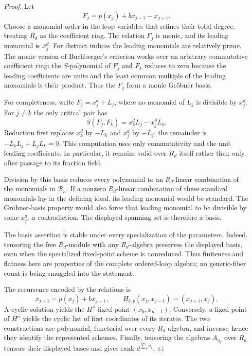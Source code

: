 \documentclass[11pt]{article}
\theoremstyle{definition}
\theoremstyle{remark}
\begin{document}
\begin{proof}
Let
\[
  F_j=p(x_j)+b x_{j-1}-x_{j+1}.
\]
Choose a monomial order in the loop variables that refines their total
degree, treating $R_d$ as the coefficient ring.  The relation $F_j$ is
monic, and its leading monomial is $x_j^d$.  For distinct indices the
leading monomials are relatively prime.  The monic version of Buchberger's
criterion works over an arbitrary commutative coefficient ring: the
$S$-polynomial of $F_j$ and $F_k$ reduces to zero because the leading
coefficients are units and the least common multiple of the leading
monomials is their product.  Thus the $F_j$ form a monic Gröbner basis.

For completeness, write $F_j=x_j^d+L_j$, where no monomial of $L_j$ is
divisible by $x_j^d$.  For $j\neq k$ the only critical pair has
\[
  S(F_j,F_k)=x_k^dL_j-x_j^dL_k.
\]
Reduction first replaces $x_k^d$ by $-L_k$ and $x_j^d$ by $-L_j$; the
remainder is $-L_kL_j+L_jL_k=0$.  This computation uses only commutativity
and the unit leading coefficients.  In particular, it remains valid over
$R_d$ itself rather than only after passage to its fraction field.

Division by this basis reduces every polynomial to an $R_d$-linear
combination of the monomials in $\mathcal B_n$.  If a nonzero
$R_d$-linear combination of these standard monomials lay in the defining
ideal, its leading monomial would be standard.  The Gröbner-basis property
would also force that leading monomial to be divisible by some $x_j^d$, a
contradiction.  The displayed spanning set is therefore a basis.

The basis assertion is stable under every specialization of the
parameters.  Indeed, tensoring the free $R_d$-module with any
$R_d$-algebra preserves the displayed basis, even when the specialized
fixed-point scheme is nonreduced.  Thus finiteness and flatness here are
properties of the complete ordered-loop algebra; no generic-fiber count is
being smuggled into the statement.

The recurrence encoded by the relations is
\[
  x_{j+1}=p(x_j)+b x_{j-1},
  \qquad
  H_{b,p}(x_j,x_{j-1})=(x_{j+1},x_j).
\]
A cyclic solution yields the $H^n$-fixed point $(x_0,x_{n-1})$.
Conversely, a fixed point of $H^n$ yields the cyclic list of first
coordinates of its iterates.  The two constructions are polynomial,
functorial over every $R_d$-algebra, and inverse; hence they identify the
represented schemes.  Finally, tensoring the algebras $A_{n_i}$ over
$R_d$ tensors their displayed bases and gives rank
$d^{\sum_i n_i}$.
\end{proof}
\end{document}
